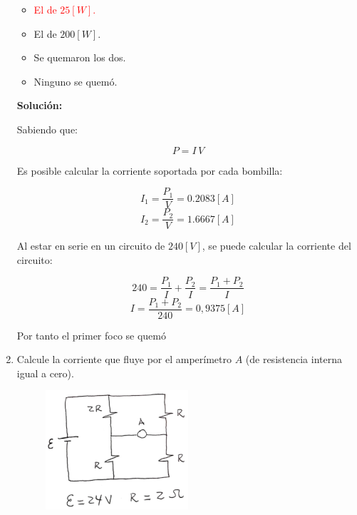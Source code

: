 \documentclass[letter,11pt]{article}
\begin{document}
\begin{enumerate}
\begin{itemize}
    \item \textcolor{red}{El de $25 [W]$.}
    \item El de $200 [W]$.
    \item Se quemaron los dos.
    \item Ninguno se quemó.
\end{itemize}

\textbf{Solución:}

Sabiendo que:

\begin{equation*}
    P = I\,V
\end{equation*}

Es posible calcular la corriente soportada por cada bombilla:

\begin{equation*}
    I_1 = \frac{P_1}{V} = 0.2083 [A]
\end{equation*}
\begin{equation*}
    I_2 = \frac{P_2}{V} = 1.6667 [A]
\end{equation*}

Al estar en serie en un circuito de $240 [V]$, se puede calcular la corriente
del circuito:

\begin{equation*}
    240 = \frac{P_1}{I}+\frac{P_2}{I}
        = \frac{P_1+P_2}{I}
\end{equation*}
\begin{equation*}
    I = \frac{P_1+P_2}{240} = 0,9375 [A]
\end{equation*}

Por tanto el primer foco se quemó

\item Calcule la corriente que fluye por el amperímetro $A$ (de resistencia
interna igual a cero).

\begin{figure}[!h]
\centering
\includegraphics[scale=2.00]{resources/q3.eps}
\end{figure}


\end{enumerate}
\end{document}
